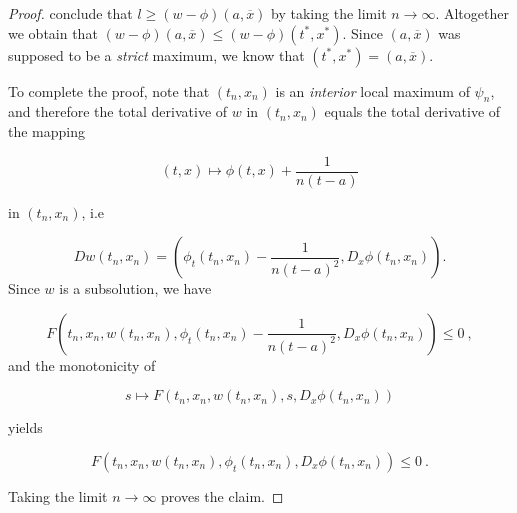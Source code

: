 \begin{lemma}
\begin{proof}
				conclude that $ l \geq (w- \phi)(a, \overline{x}) $ by taking the limit $ n \to \infty $. Altogether we obtain that $ (w - \phi)(a, \overline{x}) \leq (w - \phi)(t^{*}, x^{*}) $. Since $ (a, \overline{x}) $ was supposed to be a \emph{strict} maximum, we know that $ (t^{*}, x^{*}) = (a, \overline{x}) $.
				
				To complete the proof, note that $ (t_n, x_n) $ is an \emph{interior} local maximum of $ \psi_n $, and therefore the total derivative of $ w $ in $ (t_n, x_n) $ equals the total derivative of the mapping 
				
				\begin{equation*}
					(t, x) \mapsto \phi(t, x) + \frac{1}{n(t-a)}
				\end{equation*}
				
				in $ (t_n, x_n) $, i.e
				
				\begin{equation*}
					Dw(t_n, x_n) = \left( \phi_t(t_n, x_n) - \frac{1}{n(t-a)^2}, D_x \phi(t_n, x_n) \right) .
				\end{equation*}
				Since $ w $ is a subsolution, we have
				
				\begin{equation*}
					F \left(t_n, x_n, w(t_n, x_n), \phi_t(t_n, x_n) - \frac{1}{n(t-a)^2}, D_x \phi(t_n, x_n) \right) \leq 0 \ ,
				\end{equation*}
				and the monotonicity of
				
				\begin{equation*}
					s \mapsto F( t_n, x_n, w(t_n, x_n), s, D_x \phi(t_n, x_n ) )
				\end{equation*}
				
				yields 
				
				\begin{equation*}
					F(t_n, x_n, w(t_n, x_n), \phi_t(t_n, x_n), D_x \phi(t_n, x_n) ) \leq 0 \ .
				\end{equation*}
				
				Taking the limit $ n \to \infty $  proves the claim.
			\end{proof}
		\end{lemma}